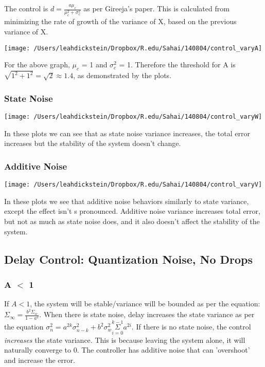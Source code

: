 \documentclass[leqno,twocolumn]{article}
\begin{document}
The control is $d = \frac{a\mu_c}{\mu_c^2+\sigma_c^2}$ as per Gireeja's paper. This is calculated from minimizing the rate of growth of the variance of X, based on the previous variance of X.

\begin{center}
\texttt{[image: /Users/leahdickstein/Dropbox/R.edu/Sahai/140804/control\_varyA]}\end{center}

For the above graph, $\mu_c$ = 1 and $\sigma_c^2$ = 1. Therefore the threshold for A is $\sqrt{1^2+1^2} = \sqrt{2} \approx 1.4$, as demonstrated by the plots.

\subsubsection{State Noise}
\begin{center}
\texttt{[image: /Users/leahdickstein/Dropbox/R.edu/Sahai/140804/control\_varyW]}\end{center}

In these plots we can see that as state noise variance increases, the total error increases but the stability of the system doesn't change.

\subsubsection{Additive Noise}
\begin{center}
\texttt{[image: /Users/leahdickstein/Dropbox/R.edu/Sahai/140804/control\_varyV]}\end{center}

In these plots we see that additive noise behaviors similarly to state variance, except the effect isn't s pronounced. Additive noise variance increases total error, but not as much as state noise does, and it also doesn't affect the stability of the system.

\subsection{Delay Control: Quantization Noise, No Drops}
\subsubsection{A $<$ 1}
If $A < 1$, the system will be stable/variance will be bounded as per the equation: $\Sigma_\infty = \frac{b^2\Sigma_w}{1-a^2}$. When there is state noise, delay increases the state variance as per the equation $\sigma^2_{n} = a^{2k}\sigma^2_{n-k} + b^2\sigma^2_w \overset{k-1}{\underset{i=0}{\Sigma}} a^{2i} $. 
If there is no state noise, the control \textit{increases} the state variance. This is because leaving the system alone, it will naturally converge to 0. The controller has additive noise that can 'overshoot' and increase the error.
\end{document}
